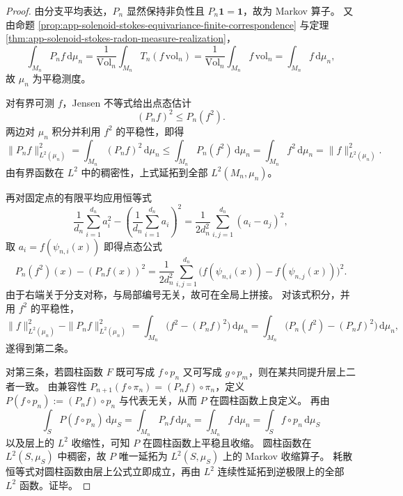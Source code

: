 \begin{proof}
由分支平均表达，\(P_n\) 显然保持非负性且 \(P_n\mathbf 1=\mathbf 1\)，故为 Markov 算子。
又由命题 \ref{prop:app-solenoid-stokes-equivariance-finite-correspondence} 与定理 \ref{thm:app-solenoid-stokes-radon-measure-realization}，
\[
\int_{M_n}P_n f\,\mathrm d\mu_n
=
\frac1{\mathrm{Vol}_n}\int_{M_n}T_n(f\,\mathrm{vol}_n)
=
\frac1{\mathrm{Vol}_n}\int_{M_n}f\,\mathrm{vol}_n
=
\int_{M_n}f\,\mathrm d\mu_n,
\]
故 \(\mu_n\) 为平稳测度。

对有界可测 \(f\)，Jensen 不等式给出点态估计
\[
(P_n f)^2\le P_n(f^2).
\]
两边对 \(\mu_n\) 积分并利用 \(f^2\) 的平稳性，即得
\[
\|P_n f\|_{L^2(\mu_n)}^2
=
\int_{M_n}(P_n f)^2\,\mathrm d\mu_n
\le
\int_{M_n}P_n(f^2)\,\mathrm d\mu_n
=
\int_{M_n}f^2\,\mathrm d\mu_n
=
\|f\|_{L^2(\mu_n)}^2.
\]
由有界函数在 \(L^2\) 中的稠密性，上式延拓到全部 \(L^2(M_n,\mu_n)\)。

再对固定点的有限平均应用恒等式
\[
\frac1{d_n}\sum_{i=1}^{d_n}a_i^2
-\left(\frac1{d_n}\sum_{i=1}^{d_n}a_i\right)^2
=
\frac1{2d_n^2}\sum_{i,j=1}^{d_n}(a_i-a_j)^2,
\]
取 \(a_i=f(\psi_{n,i}(x))\) 即得点态公式
\[
P_n(f^2)(x)-(P_nf(x))^2
=
\frac1{2d_n^2}\sum_{i,j=1}^{d_n}
\bigl(f(\psi_{n,i}(x))-f(\psi_{n,j}(x))\bigr)^2.
\]
由于右端关于分支对称，与局部编号无关，故可在全局上拼接。
对该式积分，并用 \(f^2\) 的平稳性，
\[
\|f\|_{L^2(\mu_n)}^2-\|P_nf\|_{L^2(\mu_n)}^2
=
\int_{M_n}\bigl(f^2-(P_nf)^2\bigr)\,\mathrm d\mu_n
=
\int_{M_n}\bigl(P_n(f^2)-(P_nf)^2\bigr)\,\mathrm d\mu_n,
\]
遂得到第二条。

对第三条，若圆柱函数 \(F\) 既可写成 \(f\circ p_n\) 又可写成 \(g\circ p_m\)，则在某共同提升层上二者一致。
由兼容性 \(P_{n+1}(f\circ\pi_n)=(P_n f)\circ\pi_n\)，定义
\(
P(f\circ p_n):=(P_n f)\circ p_n
\)
与代表无关，从而 \(P\) 在圆柱函数上良定义。
再由
\[
\int_S P(f\circ p_n)\,\mathrm d\mu_S
=
\int_{M_n}P_n f\,\mathrm d\mu_n
=
\int_{M_n}f\,\mathrm d\mu_n
=
\int_S f\circ p_n\,\mathrm d\mu_S
\]
以及层上的 \(L^2\) 收缩性，可知 \(P\) 在圆柱函数上平稳且收缩。
圆柱函数在 \(L^2(S,\mu_S)\) 中稠密，故 \(P\) 唯一延拓为 \(L^2(S,\mu_S)\) 上的 Markov 收缩算子。
耗散恒等式对圆柱函数由层上公式立即成立，再由 \(L^2\) 连续性延拓到逆极限上的全部 \(L^2\) 函数。证毕。
\end{proof}

\endinput
